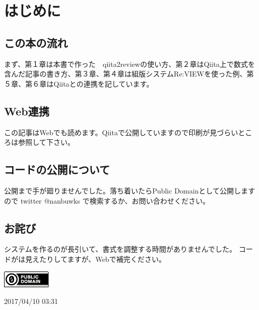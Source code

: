 \chapter{はじめに}
\label{chap:hajimeni}

\section*{この本の流れ}
\label{sec:-1}

まず、第１章は本書で作った　qiita2reviewの使い方、第２章はQiita上で数式を含んだ記事の書き方、第３章、第４章は組版システムRe:VIEWを使った例、第５章、第６章はQiitaとの連携を記しています。

\section*{Web連携}
\label{sec:-2}

この記事はWebでも読めます。Qiitaで公開していますので印刷が見づらいところは参照して下さい。

\section*{コードの公開について}
\label{sec:-3}

公開まで手が廻りませんでした。落ち着いたらPublic Domainとして公開しますので twitter @nanbuwks で検索するか、お問い合わせください。

\section*{お詫び}
\label{sec:-4}

システムを作るのが長引いて、書式を調整する時間がありませんでした。
コードがは見えたりしてますが、Webで補完ください。

\begin{reviewimage}
\includegraphics[width=\maxwidth]{./images/88x31.png}
\label{image:hajimeni:88x31}
\end{reviewimage}

2017/04/10 03:31
